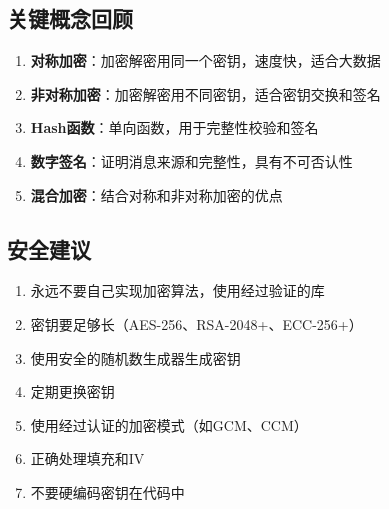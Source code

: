 \documentclass[12pt,a4paper]{article}
\begin{document}
\subsection{关键概念回顾}

\begin{enumerate}[leftmargin=1.5em]
\item \textbf{对称加密}：加密解密用同一个密钥，速度快，适合大数据
\item \textbf{非对称加密}：加密解密用不同密钥，适合密钥交换和签名
\item \textbf{Hash函数}：单向函数，用于完整性校验和签名
\item \textbf{数字签名}：证明消息来源和完整性，具有不可否认性
\item \textbf{混合加密}：结合对称和非对称加密的优点
\end{enumerate}

\subsection{安全建议}

\begin{keybox}[安全最佳实践]
\begin{enumerate}
\item 永远不要自己实现加密算法，使用经过验证的库
\item 密钥要足够长（AES-256、RSA-2048+、ECC-256+）
\item 使用安全的随机数生成器生成密钥
\item 定期更换密钥
\item 使用经过认证的加密模式（如GCM、CCM）
\item 正确处理填充和IV
\item 不要硬编码密钥在代码中
\end{enumerate}
\end{keybox}
\end{document}
